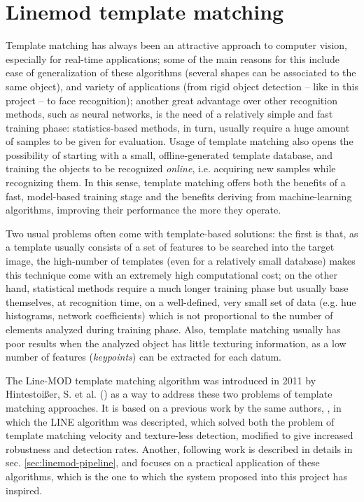 \section{Linemod template matching}
Template matching has always been an attractive approach to computer vision,
especially for real-time applications; some of the main reasons for this
include ease of generalization of
these algorithms (several shapes can be associated to the same object), and
variety of applications (from rigid object detection -- like in this project --
to face recognition); another great advantage over other recognition methods,
such as neural networks, is the need of a relatively simple and fast training phase:
statistics-based methods, in turn, usually require a huge amount 
of samples to be given for evaluation. Usage of template matching also opens
the possibility of starting with a small, offline-generated template database, and training the
objects to be recognized \emph{online}, i.e. acquiring new samples while
recognizing them. In this sense, template matching offers both the benefits of
a fast, model-based training stage and the benefits deriving from
machine-learning algorithms, improving their performance the more they operate.

Two usual problems often come with template-based solutions: the first is that,
as a template usually consists of a set of features to be searched into the
target image, the high-number of templates (even for a relatively small
database) makes this technique come with an extremely high computational cost;
on the other hand, statistical methods require a much longer training phase but
usually base themselves, at recognition time, on a well-defined, very small set of
data (e.g. hue histograms, network coefficients) which is not proportional to the number of elements
analyzed during training phase. Also, template matching usually has poor
results when the analyzed object has little texturing information, as a low
number of features (\emph{keypoints}) can be extracted for each datum.

The Line-MOD template matching algorithm was introduced in 2011 by
Hintestoi{\ss}er, S. et al. (\cite{linemod-paper}) as a way to address these
two problems of template matching approaches. It is based on a previous work by
the same authors, \cite{linemod-origins}, in which the LINE algorithm was
descripted, which solved both the problem of template matching velocity and
texture-less detection, modified to give increased robustness and detection
rates. Another, following work is described in details in sec.
\ref{sec:linemod-pipeline}, and focuses on a practical application of these
algorithms, which is the one to which the system proposed into this project has
inspired.

